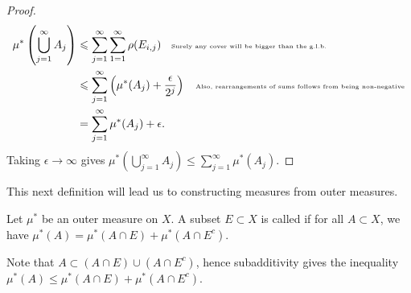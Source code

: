 \begin{proof}
\begin{equation*}
                \begin{split}
                    \mu^\ast \left( \bigcup_{j = 1}^\infty A_j \right) 
                    & \leq \sum_{j=1}^\infty \sum_{1 = 1}^\infty \rho(E_{i,j}) \h9\text{\tiny Surely any cover will be bigger than the g.l.b.}\\
                    & \leq \sum_{j = 1}^\infty \left(\mu^\ast (A_j) + \frac{\epsilon}{2^j}\right) \h9\text{\tiny Also, rearrangements of sums follows from being non-negative} \\
                    & = \sum_{j = 1}^\infty \mu^\ast(A_j) + \epsilon.
                \end{split}
                \end{equation*}
            Taking $\epsilon \rightarrow \infty$ gives $\mu^\ast \left( \bigcup_{j = 1}^\infty A_j \right) \leq \sum_{j = 1}^\infty \mu^\ast(A_j)$.
        \end{proof}

    This next definition will lead us to constructing measures from outer measures.

    \begin{definition}
        Let $\mu^\ast$ be an outer measure on $X$. A subset $E \subset X$ is called  if for all $A \subset X$, we have $\mu^\ast(A) = \mu^\ast(A \cap E) + \mu^\ast (A \cap E^c)$.
    \end{definition}

    \begin{remark}
        Note that $A \subset (A \cap E) \cup (A \cap E^c)$, hence subadditivity gives the inequality $\mu^\ast(A) \leq \mu^\ast(A \cap E) + \mu^\ast (A \cap E^c)$.
    \end{remark}

